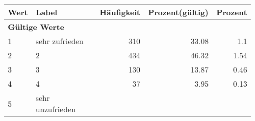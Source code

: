      \begin{longtable}{lXrrr}
     \toprule
     \textbf{Wert} & \textbf{Label} & \textbf{Häufigkeit} & \textbf{Prozent(gültig)} & \textbf{Prozent} \\
     \endhead
     \midrule
     \multicolumn{5}{l}{\textbf{Gültige Werte}}\\

     1 &
     \multicolumn{1}{X}{ sehr zufrieden   } &


       \num{310} &
       \num[round-mode=places,round-precision=2]{33.08} &
         \num[round-mode=places,round-precision=2]{1.1} \\

     2 &
     \multicolumn{1}{X}{ 2   } &


       \num{434} &
       \num[round-mode=places,round-precision=2]{46.32} &
         \num[round-mode=places,round-precision=2]{1.54} \\

     3 &
     \multicolumn{1}{X}{ 3   } &


       \num{130} &
       \num[round-mode=places,round-precision=2]{13.87} &
         \num[round-mode=places,round-precision=2]{0.46} \\

     4 &
     \multicolumn{1}{X}{ 4   } &


       \num{37} &
       \num[round-mode=places,round-precision=2]{3.95} &
         \num[round-mode=places,round-precision=2]{0.13} \\

     5 &
     \multicolumn{1}{X}{ sehr unzufrieden   } &



\end{longtable}
